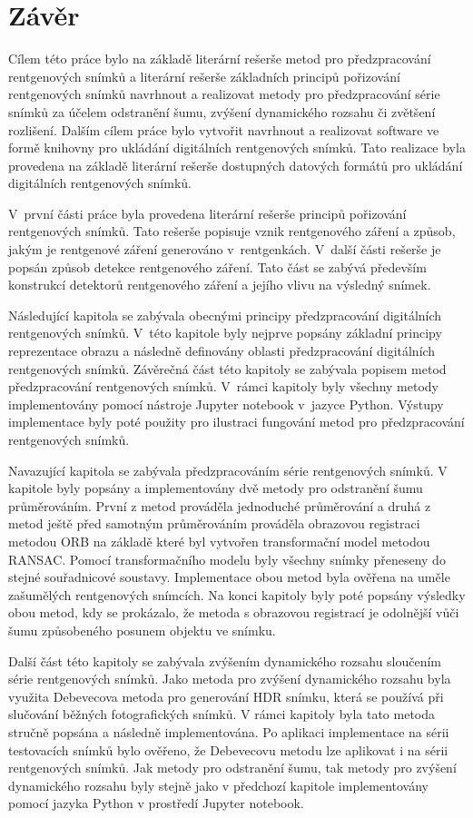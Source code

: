 \chapter{Závěr}

Cílem této práce bylo na základě literární rešerše metod pro předzpracování rentgenových snímků a literární rešerše základních principů pořizování rentgenových snímků navrhnout a realizovat metody pro předzpracování série snímků za účelem odstranění šumu, zvýšení dynamického rozsahu či zvětšení rozlišení. Dalším cílem práce bylo vytvořit navrhnout a realizovat software ve formě knihovny pro ukládání digitálních rentgenových snímků. Tato realizace byla provedena na základě literární rešerše dostupných datových formátů pro ukládání digitálních rentgenových snímků.

V~první části práce byla provedena literární rešerše principů pořizování rentgenových snímků. Tato rešerše popisuje vznik rentgenového záření a způsob, jakým je rentgenové záření generováno v~rentgenkách. V~další části rešerše je popsán způsob detekce rentgenového záření. Tato část se zabývá především konstrukcí detektorů rentgenového záření a jejího vlivu na výsledný snímek.

Následující kapitola se zabývala obecnými principy předzpracování digitálních rentgenových snímků. V~této kapitole byly nejprve popsány základní principy reprezentace obrazu a následně definovány oblasti předzpracování digitálních rentgenových snímků. Závěrečná část této kapitoly se zabývala popisem metod předzpracování rentgenových snímků. V~rámci kapitoly byly všechny metody implementovány pomocí nástroje Jupyter notebook v~jazyce Python. Výstupy implementace byly poté použity pro ilustraci fungování metod pro předzpracování rentgenových snímků.

Navazující kapitola se zabývala předzpracováním série rentgenových snímků. V kapitole byly popsány a implementovány dvě metody pro odstranění šumu průměrováním. První z metod prováděla jednoduché průměrování a druhá z metod ještě před samotným průměrováním prováděla obrazovou registraci metodou ORB na základě které byl vytvořen transformační model metodou RANSAC. Pomocí transformačního modelu byly všechny snímky přeneseny do stejné souřadnicové soustavy. Implementace obou metod byla ověřena na uměle zašumělých rentgenových snímcích. Na konci kapitoly byly poté popsány výsledky obou metod, kdy se prokázalo, že metoda s obrazovou registrací je odolnější vůči šumu způsobeného posunem objektu ve snímku.

Další část této kapitoly se zabývala zvýšením dynamického rozsahu sloučením série rentgenových snímků. Jako metoda pro zvýšení dynamického rozsahu byla využita Debevecova metoda pro generování HDR snímku, která se používá při slučování běžných fotografických snímků. V rámci kapitoly byla tato metoda stručně popsána a následně implementována. Po aplikaci implementace na sérii testovacích snímků bylo ověřeno, že Debevecovu metodu lze aplikovat i na sérii rentgenových snímků. Jak metody pro odstranění šumu, tak metody pro zvýšení dynamického rozsahu byly stejně jako v předchozí kapitole implementovány pomocí jazyka Python v prostředí Jupyter notebook.

